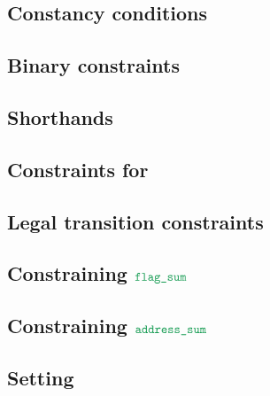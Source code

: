 \subsection{Constancy conditions                           \lispTodo{}}    \label{bls: generalities: constancy conditions}               
\subsection{Binary constraints                             \lispTodo{}}    \label{bls: generalities: binary}                             
\subsection{Shorthands                                     \lispTodo{}}    \label{bls: generalities: shorthands}                         
\subsection{Constraints for \blsStamp{}                    \lispTodo{}}    \label{bls: generalities: stamp}                              
\subsection{Legal transition constraints                   \lispTodo{}}    \label{bls: generalities: legal transitions}                  
\subsection{Constraining $\locFlagSum$                     \lispTodo{}}    \label{bls: generalities: flag sum}                           
\subsection{Constraining $\locAddressSum$                  \lispTodo{}}    \label{bls: generalities: address sum}                        
\subsection{Setting \blsPhase{}                            \lispTodo{}}    \label{bls: generalities: setting phase}                      
